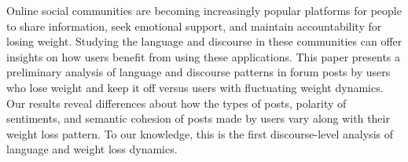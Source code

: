 Online social communities are becoming increasingly popular platforms for people to share information, seek emotional support, and maintain accountability for losing weight. Studying the language and discourse in these communities can offer insights on how users benefit from using these applications. This paper presents a preliminary analysis of language and discourse patterns in forum posts by users who lose weight and keep it off versus users with fluctuating weight dynamics.              Our results reveal differences about how the types of posts, polarity of sentiments, and semantic cohesion of posts made by users vary along with their weight loss pattern. To our knowledge, this is the first discourse-level analysis of language and weight loss dynamics.

